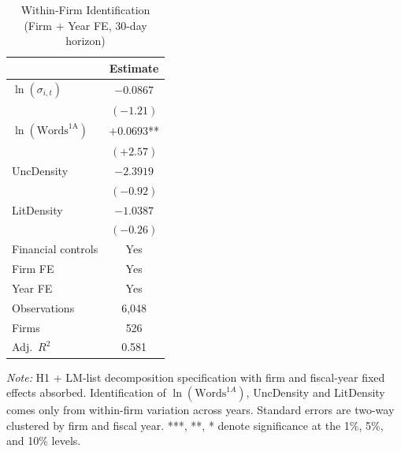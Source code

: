 \begin{table}[htbp]
\centering
\caption{Within-Firm Identification (Firm $+$ Year FE, 30-day horizon)}
\label{tab:firm_fe}
\begin{tabular}{lc}
\toprule
 & Estimate \\
\midrule
$\ln(\sigma_{i,t})$ & $-0.0867$ \\
 & $(-1.21)$ \\[4pt]
$\ln(\text{Words}^{\text{1A}})$ & $+0.0693$** \\
 & $(+2.57)$ \\[4pt]
UncDensity & $-2.3919$ \\
 & $(-0.92)$ \\[4pt]
LitDensity & $-1.0387$ \\
 & $(-0.26)$ \\[4pt]
\midrule
Financial controls & Yes \\
Firm FE & Yes \\
Year FE & Yes \\
Observations & 6,048 \\
Firms & 526 \\
Adj.\ $R^2$ & 0.581 \\
\bottomrule
\end{tabular}
\par\smallskip
\noindent\footnotesize 
\textit{Note:} H1 + LM-list decomposition specification with firm and fiscal-year fixed effects absorbed. Identification of $\ln(\text{Words}^{1A})$, UncDensity and LitDensity comes only from within-firm variation across years. Standard errors are two-way clustered by firm and fiscal year. ***, **, * denote significance at the 1\%, 5\%, and 10\% levels.
\end{table}
